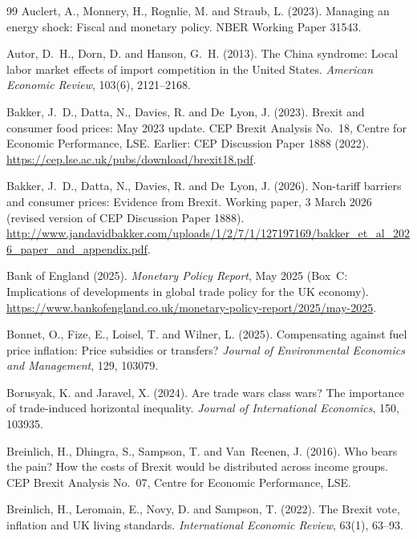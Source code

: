 \begin{thebibliography}{99}
Auclert, A., Monnery, H., Rognlie, M. and Straub, L. (2023).
\newblock Managing an energy shock: Fiscal and monetary policy.
\newblock NBER Working Paper 31543.

Autor, D.~H., Dorn, D. and Hanson, G.~H. (2013).
\newblock The China syndrome: Local labor market effects of import competition in the United States.
\newblock \emph{American Economic Review}, 103(6), 2121--2168.

Bakker, J.~D., Datta, N., Davies, R. and De~Lyon, J. (2023).
\newblock Brexit and consumer food prices: May 2023 update.
\newblock CEP Brexit Analysis No.~18, Centre for Economic Performance, LSE. Earlier: CEP Discussion Paper 1888 (2022). \url{https://cep.lse.ac.uk/pubs/download/brexit18.pdf}.

Bakker, J.~D., Datta, N., Davies, R. and De~Lyon, J. (2026).
\newblock Non-tariff barriers and consumer prices: Evidence from Brexit.
\newblock Working paper, 3 March 2026 (revised version of CEP Discussion Paper 1888). \url{http://www.jandavidbakker.com/uploads/1/2/7/1/127197169/bakker_et_al_2026_paper_and_appendix.pdf}.

Bank of England (2025).
\newblock \emph{Monetary Policy Report}, May 2025 (Box~C: Implications of developments in global trade policy for the UK economy).
\newblock \url{https://www.bankofengland.co.uk/monetary-policy-report/2025/may-2025}.

Bonnet, O., Fize, E., Loisel, T. and Wilner, L. (2025).
\newblock Compensating against fuel price inflation: Price subsidies or transfers?
\newblock \emph{Journal of Environmental Economics and Management}, 129, 103079.

Borusyak, K. and Jaravel, X. (2024).
\newblock Are trade wars class wars? The importance of trade-induced horizontal inequality.
\newblock \emph{Journal of International Economics}, 150, 103935.

Breinlich, H., Dhingra, S., Sampson, T. and Van~Reenen, J. (2016).
\newblock Who bears the pain? How the costs of Brexit would be distributed across income groups.
\newblock CEP Brexit Analysis No.~07, Centre for Economic Performance, LSE.

Breinlich, H., Leromain, E., Novy, D. and Sampson, T. (2022).
\newblock The Brexit vote, inflation and UK living standards.
\newblock \emph{International Economic Review}, 63(1), 63--93.


\end{thebibliography}
